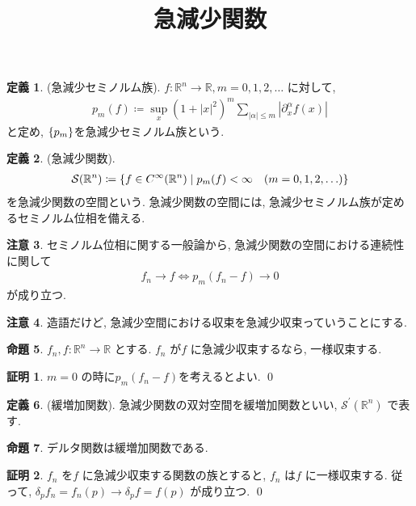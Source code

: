 \documentclass[10pt, fleqn, label-section=none]{bxjsarticle}
\title{急減少関数}
\date{}
\author{}
\theoremstyle{definition}
\newtheorem{dfn}{定義}[section]
\newtheorem{prop}[dfn]{命題}
\newtheorem*{pf*}{証明}
\newtheorem{remark}[dfn]{注意}
\newcommand{\cbra}[1]{\mleft\{#1\mright\}}
\newcommand{\abs}[1]{\left|#1\right|}
\newcommand{\LR}{\Leftrightarrow}
\renewcommand{\;}{\, ; \,}
\begin{document}
\maketitle

\section{}

\begin{dfn}(急減少セミノルム族). $f: \mathbb R^n \rightarrow \mathbb R, m = 0, 1, 2, \ldots$ に対して, 
\begin{align*} p_m(f) \coloneqq \sup_x (1 + \abs x ^2) ^ m \sum_{\abs \alpha \leq m} \abs{\partial_x ^\alpha f(x)} \end{align*}
と定め, $\cbra{p_m}$を急減少セミノルム族という. 
\end{dfn}

\begin{dfn}(急減少関数). 
\begin{align*} \mathcal S(\mathbb R^n) \coloneqq  \cbra{f \in C^\infty (\mathbb R^n) \mid p_m(f) < \infty \quad (m = 0,1,2,\ldots)}\end{align*}
を急減少関数の空間という. 急減少関数の空間には, 急減少セミノルム族が定めるセミノルム位相を備える. 
\end{dfn}

\begin{remark}セミノルム位相に関する一般論から, 急減少関数の空間における連続性に関して
\begin{align*} f_n \rightarrow f \LR p_m(f_n - f) \rightarrow 0 \end{align*}
が成り立つ.
\end{remark}

\begin{remark}
造語だけど, 急減少空間における収束を急減少収束っていうことにする. 
\end{remark}



\begin{prop}$f_n, f: \mathbb R^n \rightarrow \mathbb R$ とする. $f_n$ が$f$ に急減少収束するなら, 一様収束する. 
\end{prop}
\begin{pf*}
$m = 0$ の時に$p_m (f_n - f)$を考えるとよい. 
\qed
\end{pf*}


\begin{dfn}(緩増加関数). 急減少関数の双対空間を緩増加関数といい, $\mathcal S^\prime (\mathbb R^n)$ で表す. 
\end{dfn}

\begin{prop}デルタ関数は緩増加関数である. 
\end{prop}
\begin{pf*}
$f_n $ を$f$ に急減少収束する関数の族とすると, $f_n$ は$f$ に一様収束する. 従って, $\delta_p f_n = f_n (p) \rightarrow \delta_p f = f(p)$ が成り立つ. 
\qed
\end{pf*}
\end{document}
